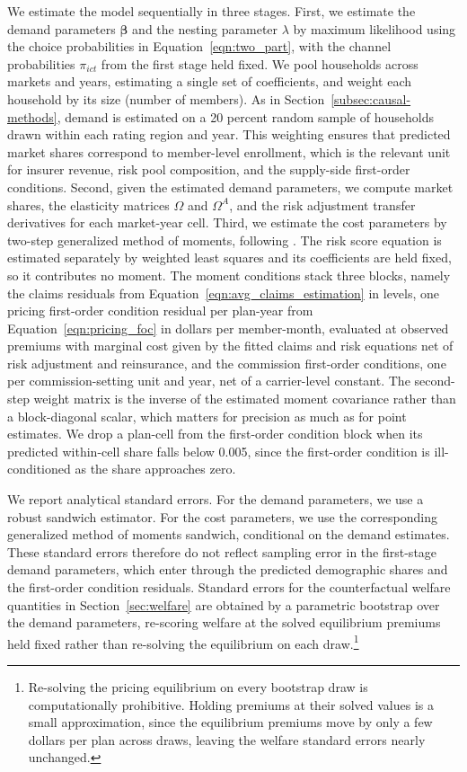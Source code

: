 \documentclass[12pt]{article}
\begin{document}
We estimate the model sequentially in three stages. First, we estimate the demand parameters $\boldsymbol{\beta}$ and the nesting parameter $\lambda$ by maximum likelihood using the choice probabilities in Equation~\eqref{eqn:two_part}, with the channel probabilities $\pi_{ict}$ from the first stage held fixed. We pool households across markets and years, estimating a single set of coefficients, and weight each household by its size (number of members). As in Section~\ref{subsec:causal-methods}, demand is estimated on a 20 percent random sample of households drawn within each rating region and year. This weighting ensures that predicted market shares correspond to member-level enrollment, which is the relevant unit for insurer revenue, risk pool composition, and the supply-side first-order conditions. Second, given the estimated demand parameters, we compute market shares, the elasticity matrices $\Omega$ and $\Omega^A$, and the risk adjustment transfer derivatives for each market-year cell. Third, we estimate the cost parameters by two-step generalized method of moments, following \cite{saltzman2019}. The risk score equation is estimated separately by weighted least squares and its coefficients are held fixed, so it contributes no moment. The moment conditions stack three blocks, namely the claims residuals from Equation~\eqref{eqn:avg_claims_estimation} in levels, one pricing first-order condition residual per plan-year from Equation~\eqref{eqn:pricing_foc} in dollars per member-month, evaluated at observed premiums with marginal cost given by the fitted claims and risk equations net of risk adjustment and reinsurance, and the commission first-order conditions, one per commission-setting unit and year, net of a carrier-level constant. The second-step weight matrix is the inverse of the estimated moment covariance rather than a block-diagonal scalar, which matters for precision as much as for point estimates. We drop a plan-cell from the first-order condition block when its predicted within-cell share falls below 0.005, since the first-order condition is ill-conditioned as the share approaches zero.

We report analytical standard errors. For the demand parameters, we use a robust sandwich estimator. For the cost parameters, we use the corresponding generalized method of moments sandwich, conditional on the demand estimates. These standard errors therefore do not reflect sampling error in the first-stage demand parameters, which enter through the predicted demographic shares and the first-order condition residuals. Standard errors for the counterfactual welfare quantities in Section~\ref{sec:welfare} are obtained by a parametric bootstrap over the demand parameters, re-scoring welfare at the solved equilibrium premiums held fixed rather than re-solving the equilibrium on each draw.\footnote{Re-solving the pricing equilibrium on every bootstrap draw is computationally prohibitive. Holding premiums at their solved values is a small approximation, since the equilibrium premiums move by only a few dollars per plan across draws, leaving the welfare standard errors nearly unchanged.}
\end{document}
